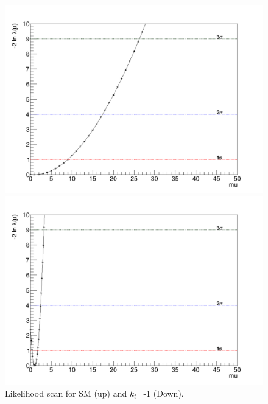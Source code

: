 	\begin{figure}[!htbp]
		\centering
		\begin{minipage}[b]{0.55\textwidth}
			\includegraphics[width=\textwidth]{Chapter4/Likelihood.png}
		\end{minipage}
		\hfill
		\begin{minipage}[b]{0.55\textwidth}
			\includegraphics[width=\textwidth]{Chapter4/Likelihood-kt-1.png}
		\end{minipage}
		\caption{Likelihood scan for SM (up) and $k_t$=-1 (Down).}
		\label{scanl}
	\end{figure}
	\pagebreak
	
